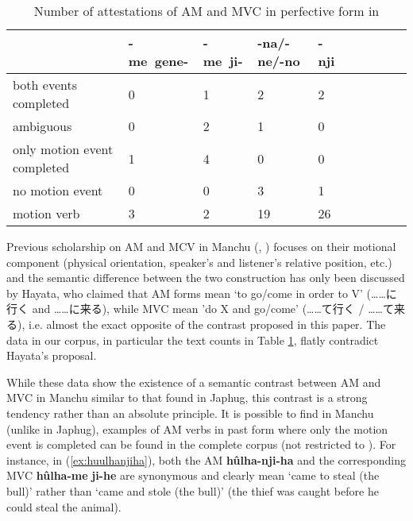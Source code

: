 \documentclass{article}
\newcommand{\ipa}[1]{\textbf{{\phon\mbox{#1}}}} %
\newcommand{\zh}[1]{{\cn#1}}
\begin{document}
\begin{table}[h]
\caption{Number of attestations of AM and MVC in perfective form in \citet{cosmo06dzengseo} } \centering \label{tab:counts.dzengsheo}
\begin{tabular}{llllllllll}
\toprule
 & 	\ipa{-me gene-} & 	\ipa{-me ji-} & 	\ipa{-na/-ne/-no} & 	\ipa{-nji} & 	\\
 \midrule
both events completed & 	0 & 	1 & 	2 & 	2 & 	\\
ambiguous & 	0 & 	2 & 	1 & 	0 & 	\\
only motion event completed & 	1 & 	4 & 	0 & 	0 & 	\\
no motion event & 	0 & 	0 & 	3 & 	1 & 	\\
motion verb & 	3 & 	2 & 	19 & 	26 & 	\\
\bottomrule
\end{tabular}
\end{table}


Previous scholarship on AM and MCV in Manchu (\citealt{hayata95yuku}, \citealt{kubo97come}) focuses on their motional component (physical orientation, speaker’s and listener’s relative position, etc.) and the semantic difference between the two construction has only been discussed by Hayata, who claimed that AM forms mean ‘to go/come in order to V’ (\zh{……に行く} and \zh{……に来る}), while MVC mean 'do X and go/come' (\zh{……て行く} / \zh{……て来る}), i.e. almost the exact opposite of the contrast proposed in this paper. The data in our corpus, in particular the text counts in Table \ref{tab:counts.dzengsheo}, flatly contradict Hayata's proposal.

While these data show the existence of a semantic contrast between AM and MVC in Manchu similar to that found in Japhug, this contrast is a strong tendency rather than an absolute principle. It is possible to find in Manchu (unlike in Japhug), examples of AM verbs in past form where only the motion event is completed can be found in the complete corpus (not restricted to \citet{cosmo06dzengseo}). For instance,  in (\ref{ex:huulhanjiha}), both the AM \ipa{hûlha-nji-ha} and the corresponding MVC \ipa{hûlha-me} \ipa{ji-he} are synonymous and clearly mean `came to steal (the bull)' rather than `came and stole (the bull)' (the thief was caught before he could steal the animal).
\end{document}
